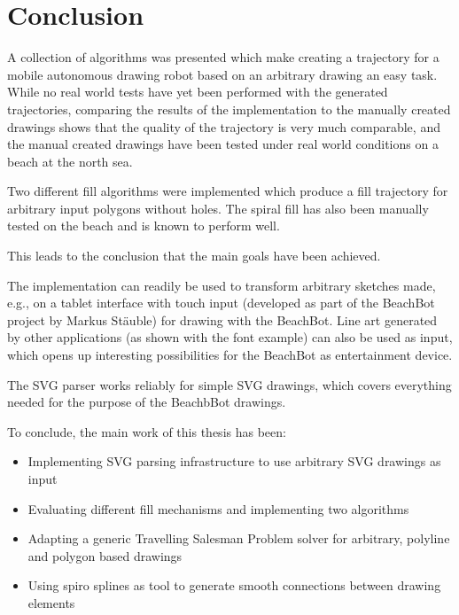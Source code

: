 \chapter{Conclusion}

A collection of algorithms was presented which make creating a trajectory for a mobile autonomous drawing robot based on an arbitrary drawing an easy task. While no real world tests have yet been performed with the generated trajectories, comparing the results of the implementation to the manually created drawings shows that the quality of the trajectory is very much comparable, and the manual created drawings have been tested under real world conditions on a beach at the north sea. 

Two different fill algorithms were implemented which produce a fill trajectory for arbitrary input polygons without holes. The spiral fill has also been manually tested on the beach and is known to perform well.


This leads to the conclusion that the main goals have been achieved.

The implementation can readily be used to transform arbitrary sketches made, e.g., on a tablet interface with touch input (developed as part of the BeachBot project by Markus Stäuble) for drawing with the BeachBot. Line art generated by other applications (as shown with the font example) can also be used as input, which opens up interesting possibilities for the BeachBot as entertainment device.

The SVG parser works reliably for simple SVG drawings, which covers everything needed for the purpose of the BeachbBot drawings.


To conclude, the main work of this thesis has been:

\begin{itemize}
\item Implementing SVG parsing infrastructure to use arbitrary SVG drawings as input
\item Evaluating different fill mechanisms and implementing two algorithms
\item Adapting a generic Travelling Salesman Problem solver for arbitrary, polyline and polygon based drawings
\item Using spiro splines as tool to generate smooth connections between drawing elements
\end{itemize}


